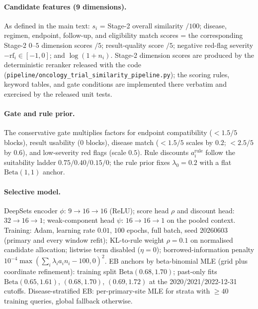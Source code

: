 \documentclass[11pt]{article}
\begin{document}
\paragraph{Candidate features (9 dimensions).} As defined in the main text:
$s_i$ = Stage-2 overall similarity $/100$; disease, regimen, endpoint,
follow-up, and eligibility match scores = the corresponding Stage-2 $0$--$5$
dimension scores $/5$; result-quality score $/5$; negative red-flag severity
$-\mathrm{rf}_i \in [-1,0]$; and $\log(1+n_i)$. Stage-2 dimension scores are
produced by the deterministic reranker released with the code
(\texttt{pipeline/\allowbreak oncology\_trial\_similarity\_pipeline.py}); the scoring
rules, keyword tables, and gate conditions are implemented there verbatim and
exercised by the released unit tests.

\paragraph{Gate and rule prior.} The conservative gate multiplies factors for
endpoint compatibility ($<1.5/5$ blocks), result usability ($0$ blocks),
disease match ($<1.5/5$ scales by $0.2$; $<2.5/5$ by $0.6$), and low-severity
red flags (scale $0.5$). Rule discounts $a^{\mathrm{rule}}_i$ follow the
suitability ladder $0.75/0.40/0.15/0$; the rule prior fixes $\lambda_0=0.2$
with a flat $\mathrm{Beta}(1,1)$ anchor.

\paragraph{Selective model.} DeepSets encoder $\phi$: $9 \to 16 \to 16$
(ReLU); score head $\rho$ and discount head: $32 \to 16 \to 1$; weak-component
head $\psi$: $16 \to 16 \to 1$ on the pooled context. Training: Adam, learning
rate $0.01$, $100$ epochs, full batch, seed $20260603$ (primary and every
window refit); KL-to-rule weight $\rho = 0.1$ on normalised candidate
allocation; listwise term disabled ($\eta = 0$); borrowed-information penalty
$10^{-4}\max(\sum_i \lambda_i a_i n_i - 100, 0)^2$. EB anchors by
beta-binomial MLE (grid plus coordinate refinement): training split
$\mathrm{Beta}(0.68, 1.70)$; past-only fits $\mathrm{Beta}(0.65,1.61)$,
$(0.68,1.70)$, $(0.69,1.72)$ at the 2020/2021/2022-12-31 cutoffs.
Disease-stratified EB: per-primary-site MLE for strata with $\ge 40$ training
queries, global fallback otherwise.
\end{document}
